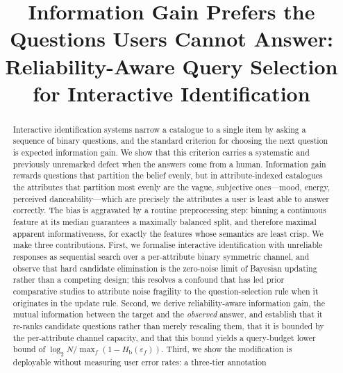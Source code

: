 \documentclass[conference]{IEEEtran}
\newcommand{\Hb}{H_{\mathrm{b}}}
\begin{document}
\title{Information Gain Prefers the Questions Users Cannot Answer:\\
Reliability-Aware Query Selection for Interactive Identification}

\author{
}

\maketitle

\begin{abstract}
Interactive identification systems narrow a catalogue to a single item by
asking a sequence of binary questions, and the standard criterion for choosing
the next question is expected information gain. We show that this criterion
carries a systematic and previously unremarked defect when the answers come
from a human. Information gain rewards questions that partition the belief
evenly, but in attribute-indexed catalogues the attributes that partition most
evenly are the vague, subjective ones---mood, energy, perceived
danceability---which are precisely the attributes a user is least able to
answer correctly. The bias is aggravated by a routine preprocessing step:
binning a continuous feature at its median guarantees a maximally balanced
split, and therefore maximal apparent informativeness, for exactly the features
whose semantics are least crisp. We make three contributions. First, we
formalise interactive identification with unreliable responses as sequential
search over a per-attribute binary symmetric channel, and observe that hard
candidate elimination is the zero-noise limit of Bayesian updating rather than
a competing design; this resolves a confound that has led prior comparative
studies to attribute noise fragility to the question-selection rule when it
originates in the update rule. Second, we derive reliability-aware information
gain, the mutual information between the target and the \emph{observed}
answer, and establish that it re-ranks candidate questions rather than merely
rescaling them, that it is bounded by the per-attribute channel capacity, and
that this bound yields a query-budget lower bound of
$\log_2 N / \max_f(1-\Hb(\varepsilon_f))$. Third, we show the modification is
deployable without measuring user error rates: a three-tier annotation

\end{abstract}
\end{document}

